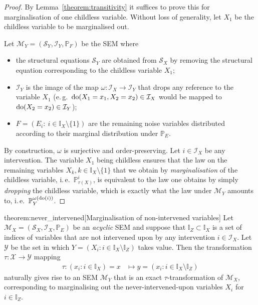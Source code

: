 \begin{proof}
By Lemma~\ref{theorem:transitivity} it suffices to prove this for marginalisation of one childless variable.
Without loss of generality, let $X_1$ be the childless variable to be marginalised out.

Let $\mathcal{M}_Y=(\mathcal{S}_Y,\mathcal{I}_Y,\mathbb{P}_F)$ be the SEM where
%
\begin{itemize}
    \item the structural equations $\mathcal{S}_Y$ are obtained from $\mathcal{S}_X$ by removing the structural equation corresponding to the childless variable $X_1$;
    \item $\mathcal{I}_Y$ is the image of the map $\omega:\mathcal{I}_X \to \mathcal{I}_Y$ that drops any reference to the variable $X_1$ (e.\,g.\ ${\operatorname{do}( X_1=x_1, X_2=x_2) \in \mathcal{I}_X}$ would be mapped to $\operatorname{do}(X_2=x_2) \in \mathcal{I}_Y$);
    \item $F = (E_i:\ i \in \mathbb{I}_X\setminus\{1\})$ are the remaining noise variables distributed according to their marginal distribution under $\mathbb{P}_E$.
\end{itemize}
%
By construction, $\omega$ is surjective and order-preserving.
Let $i\in\mathcal{I}_X$ be any intervention.
The variable $X_1$ being childless ensures that the law on the remaining variables $X_k,k\in\mathbb{I}_X\setminus\{1\}$ that we obtain by \emph{marginalisation} of the childless variable, i.\,e.\ $\mathbb{P}_{\tau(X)}^{i}$, is equivalent to the law one obtains by simply \emph{dropping} the childless variable, which is exactly what the law under $\mathcal{M}_Y$ amounts to, i.\,e.\ $\mathbb{P}_Y^{\omega({\operatorname{do}(i)})}$.
\end{proof}


\medskip


\begin{reptheorem}{theorem:never_intervened}[Marginalisation of non-intervened variables]
Let $\mathcal{M}_X=(\mathcal{S}_X,\mathcal{I}_X,\mathbb{P}_E)$ be an \emph{acyclic} SEM and suppose that ${\mathbb{I}_Z\subset\mathbb{I}_X}$ is a set of indices of variables that are not intervened upon by any intervention $i\in\mathcal{I}_X$.
Let $\mathcal{Y}$ be the set in which $Y = \left( X_i: i\in\mathbb{I}_X\setminus \mathbb{I}_Z \right)$ takes value.
Then the transformation $\tau: \mathcal{X} \to \mathcal{Y}$ mapping
\begin{align*}
   \tau: \left( x_i: i\in\mathbb{I}_X \right) = x &\mapsto y = \left( x_i: i\in\mathbb{I}_X\setminus \mathbb{I}_Z \right)
\end{align*}
naturally gives rise to an SEM $\mathcal{M}_Y$ that is an exact $\tau$-transformation of $\mathcal{M}_X$, corresponding to marginalising out the never-intervened-upon variables $X_i$ for $i\in\mathbb{I}_Z$.
\end{reptheorem}


